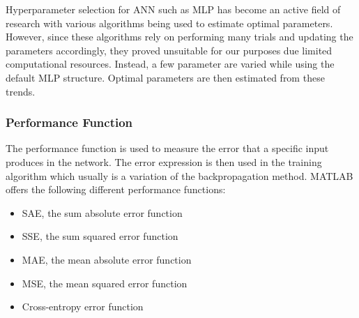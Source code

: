 Hyperparameter selection for ANN such as MLP has become an active field of research with various algorithms being used to estimate optimal parameters\cite{bergstra2011algorithms}. However, since these algorithms rely on performing many trials and updating the parameters accordingly, they proved unsuitable for our purposes due limited computational resources. Instead, a few parameter are varied while using the default MLP structure. Optimal parameters are then estimated from these trends.
%
%
%

 \subsubsection{Performance Function}

 The performance function is used to measure the error that a specific input produces in the network. The error expression is then used in the training algorithm which usually is a variation of the backpropagation method\cite{hecht1988theory}. MATLAB offers the following different performance functions:

 \begin{itemize}
 	\item SAE, the sum absolute error function
 	\item SSE, the sum squared error function
 	\item MAE, the mean absolute error function
 	\item MSE, the mean squared error function
 	\item Cross-entropy error function
 \end{itemize}

